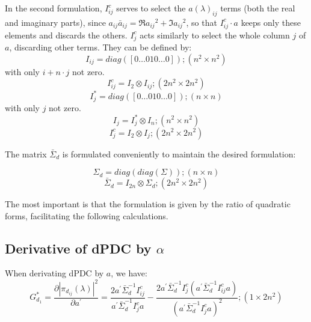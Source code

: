 \documentclass[a4paper,10pt]{article}
\begin{document}
In the second formulation, $I_{ij}^{c}$ serves to select the $a(\lambda)_{ij}$ terms (both the real and imaginary parts), since $a_{ij} \bar {a}_{ij} = \Re{a_{ij}}^2 + \Im{a_{ij}}^2$, so that $I_{ij}^{c} \cdot a$ keeps only these elements and discards the others. $I_{j}^{c}$ acts similarly to select the whole column $j$ of $a$, discarding other terms. They can be defined by:
\begin{equation}
I_{ij} = diag(\left[ 0 \dots 0 1 0 \dots 0 \right]); (n^{2} \times n^{2})
\end{equation} 
with only $i+n\cdot j$ not zero.
\begin{equation}
I_{ij}^{c} = I_{2} \otimes I_{ij}; (2n^{2} \times 2n^{2}) 
\end{equation}
\begin{equation}
I_{j}^{\ast} = diag([0 \dots 0 1 0 \dots 0]); (n \times n)
\end{equation}
with only $j$ not zero.
\begin{equation}
I_{j} = I_{j}^{\ast} \otimes I_{n}; (n^{2} \times n^{2})
\end{equation}
\begin{equation}
I_{j}^{c} = I_{2} \otimes I_{j}; (2n^{2} \times 2n^{2})
\end{equation}

The matrix $\bar{\Sigma}_{d}$ is formulated conveniently to maintain the desired formulation:

\begin{equation}
\Sigma_{d} = diag(diag(\Sigma)); (n \times n)
\end{equation}
\begin{equation}
\bar{\Sigma}_{d} = I_{2n} \otimes \Sigma_{d}; (2n^{2} \times 2n^{2})
\end{equation}

The most important is that the formulation is given by the ratio of quadratic forms, facilitating the following calculations.

\subsection{Derivative of dPDC by $\alpha$}

When derivating dPDC by $a$, we have:
\begin{equation}
G_{d_1}^{\ast} = \frac{\partial |\pi_{d_{ij}}(\lambda)|^{2}}{\partial a^{'}} = \frac{2 a^{'} \bar{\Sigma}_{d}^{-1} I_{ij}^{c}} {a^{'} \bar{\Sigma}_{d}^{-1} I_{j}^{c} a} - \frac{2 a^{'} \bar{\Sigma}_{d}^{-1} I_{j}^{c} (a^{'} \bar{\Sigma}_{d}^{-1} I_{ij}^{c} a)} {(a^{'} \bar{\Sigma}_{d}^{-1} I_{j}^{c} a)^{2}}; (1 \times 2n^{2})
\end{equation}
\end{document}
